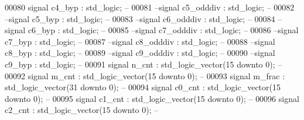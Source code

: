 \begin{DoxyCode}
00080 \textcolor{keywordflow}{signal} \textcolor{vhdlchar}{c4_byp}           \textcolor{vhdlchar}{:}  \textcolor{comment}{std\_logic};\textcolor{keyword}{ --}
00081 \textcolor{keyword}{--signal c5\_odddiv      :  std\_logic; --}
00082 \textcolor{keyword}{--signal c5\_byp         :  std\_logic; --}
00083 \textcolor{keyword}{--signal c6\_odddiv      :  std\_logic; --}
00084 \textcolor{keyword}{--signal c6\_byp         :  std\_logic; --}
00085 \textcolor{keyword}{--signal c7\_odddiv      :  std\_logic; --}
00086 \textcolor{keyword}{--signal c7\_byp         :  std\_logic; --}
00087 \textcolor{keyword}{--signal c8\_odddiv      :  std\_logic; --}
00088 \textcolor{keyword}{--signal c8\_byp         :  std\_logic; --}
00089 \textcolor{keyword}{--signal c9\_odddiv      :  std\_logic; --}
00090 \textcolor{keyword}{--signal c9\_byp         :  std\_logic; --    }
00091 \textcolor{keywordflow}{signal} \textcolor{vhdlchar}{n_cnt}            \textcolor{vhdlchar}{:}  \textcolor{comment}{std\_logic\_vector}\textcolor{vhdlchar}{(}\textcolor{vhdllogic}{}\textcolor{vhdllogic}{15} \textcolor{keywordflow}{downto} \textcolor{vhdllogic}{}\textcolor{vhdllogic}{0}\textcolor{vhdlchar}{)};\textcolor{keyword}{ -- }
00092 \textcolor{keywordflow}{signal} \textcolor{vhdlchar}{m_cnt}            \textcolor{vhdlchar}{:}  \textcolor{comment}{std\_logic\_vector}\textcolor{vhdlchar}{(}\textcolor{vhdllogic}{}\textcolor{vhdllogic}{15} \textcolor{keywordflow}{downto} \textcolor{vhdllogic}{}\textcolor{vhdllogic}{0}\textcolor{vhdlchar}{)};\textcolor{keyword}{ -- }
00093 \textcolor{keywordflow}{signal} \textcolor{vhdlchar}{m_frac}           \textcolor{vhdlchar}{:}  \textcolor{comment}{std\_logic\_vector}\textcolor{vhdlchar}{(}\textcolor{vhdllogic}{}\textcolor{vhdllogic}{31} \textcolor{keywordflow}{downto} \textcolor{vhdllogic}{}\textcolor{vhdllogic}{0}\textcolor{vhdlchar}{)};\textcolor{keyword}{ -- }
00094 \textcolor{keywordflow}{signal} \textcolor{vhdlchar}{c0_cnt}           \textcolor{vhdlchar}{:}  \textcolor{comment}{std\_logic\_vector}\textcolor{vhdlchar}{(}\textcolor{vhdllogic}{}\textcolor{vhdllogic}{15} \textcolor{keywordflow}{downto} \textcolor{vhdllogic}{}\textcolor{vhdllogic}{0}\textcolor{vhdlchar}{)};\textcolor{keyword}{ -- }
00095 \textcolor{keywordflow}{signal} \textcolor{vhdlchar}{c1_cnt}           \textcolor{vhdlchar}{:}  \textcolor{comment}{std\_logic\_vector}\textcolor{vhdlchar}{(}\textcolor{vhdllogic}{}\textcolor{vhdllogic}{15} \textcolor{keywordflow}{downto} \textcolor{vhdllogic}{}\textcolor{vhdllogic}{0}\textcolor{vhdlchar}{)};\textcolor{keyword}{ -- }
00096 \textcolor{keywordflow}{signal} \textcolor{vhdlchar}{c2_cnt}           \textcolor{vhdlchar}{:}  \textcolor{comment}{std\_logic\_vector}\textcolor{vhdlchar}{(}\textcolor{vhdllogic}{}\textcolor{vhdllogic}{15} \textcolor{keywordflow}{downto} \textcolor{vhdllogic}{}\textcolor{vhdllogic}{0}\textcolor{vhdlchar}{)};\textcolor{keyword}{ -- }

\end{DoxyCode}
